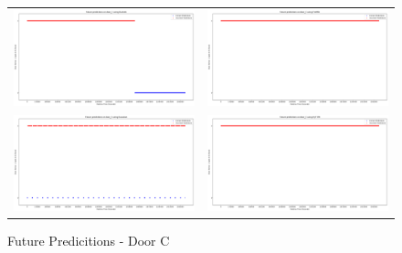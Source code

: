 \begin{figure}
  \begin{tabular}{cc}
    {\includegraphics[width = 3in]{images/results/Future_door_C_Duckett.png}} &
    {\includegraphics[width = 3in]{images/results/Future_door_C_FreMEn.png}} \\
    {\includegraphics[width = 3in]{images/results/Future_door_C_Gaussian.png}} &
    {\includegraphics[width = 3in]{images/results/Future_door_C_HyT-EM.png}} \\
  \end{tabular}
  \caption{Future Predicitions - Door C}
\end{figure}\\ \\

